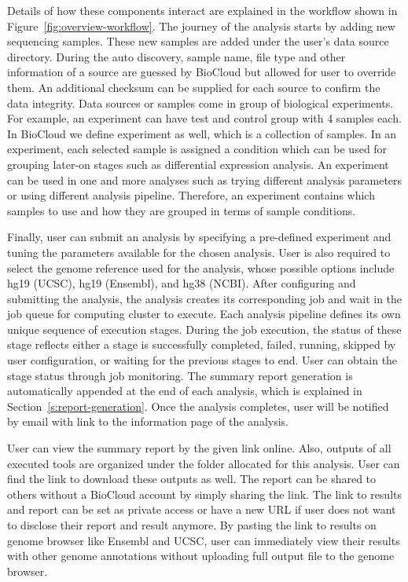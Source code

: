 Details of how these components interact are explained in the workflow shown in
Figure~\ref{fig:overview-workflow}. The journey of the analysis starts by
adding new sequencing samples. These new samples are added under the user's
data source directory. During the auto discovery, sample name, file type and
other information of a source are guessed by BioCloud but allowed for user to
override them. An additional checksum can be supplied for each source to
confirm the data integrity. Data sources or samples come in group of biological
experiments. For example, an experiment can have test and control group
with 4 samples each. In BioCloud we define experiment as well, which is a
collection of samples. In an experiment, each selected sample is assigned a
condition which can be used for grouping later-on stages such as differential
expression analysis. An experiment can be used in one and more analyses such as
trying different analysis parameters or using different analysis pipeline.
Therefore, an experiment contains which samples to use and how they are grouped
in terms of sample conditions.

Finally, user can submit an analysis by specifying a pre-defined experiment and
tuning the parameters available for the chosen analysis. User is also required
to select the genome reference used for the analysis, whose possible options
include hg19 (UCSC), hg19 (Ensembl), and hg38 (NCBI). After configuring and
submitting the analysis, the analysis creates its corresponding job and wait in
the job queue for computing cluster to execute. Each analysis pipeline defines
its own unique sequence of execution stages. During the job execution, the
status of these stage reflects either a stage is successfully completed,
failed, running, skipped by user configuration, or waiting for the previous
stages to end. User can obtain the stage status through job monitoring. The
summary report generation is automatically appended at the end of each
analysis, which is explained in Section~\ref{s:report-generation}. Once the
analysis completes, user will be notified by email with link to the information
page of the analysis.

User can view the summary report by the given link online. Also, outputs of all
executed tools are organized under the folder allocated for this analysis. User
can find the link to download these outputs as well. The report can be shared
to others without a BioCloud account by simply sharing the link. The link to
results and report can be set as private access or have a new URL if user does
not want to disclose their report and result anymore. By pasting the link to
results on genome browser like Ensembl and UCSC, user can immediately view
their results with other genome annotations without uploading full output file
to the genome browser.

